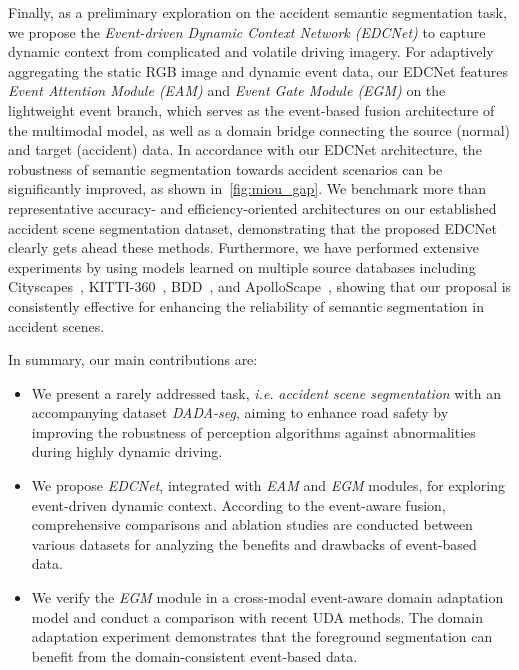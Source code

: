 \documentclass[journal]{IEEEtran}
\begin{document}
Finally, as a preliminary exploration on the accident semantic segmentation task, we propose the \emph{Event-driven Dynamic Context Network (EDCNet)} to capture dynamic context from complicated and volatile driving imagery. For adaptively aggregating the static RGB image and dynamic event data, our EDCNet features \emph{Event Attention Module (EAM)} and \emph{Event Gate Module (EGM)} on the lightweight event branch, which serves as the event-based fusion architecture of the multimodal model, as well as a domain bridge connecting the source (normal) and target (accident) data. In accordance with our EDCNet architecture, the robustness of semantic segmentation towards accident scenarios can be significantly improved, as shown in~\cref{fig:miou_gap}. We benchmark more than  representative accuracy- and efficiency-oriented architectures on our established accident scene segmentation dataset, demonstrating that the proposed EDCNet clearly gets ahead these methods. Furthermore, we have performed extensive experiments by using models learned on multiple source databases including Cityscapes~\cite{cordts2016cityscapes}, KITTI-360~\cite{xie2016semantic}, BDD~\cite{yu2020bdd100k}, and ApolloScape~\cite{wang2019apolloscape}, showing that our proposal is consistently effective for enhancing the reliability of semantic segmentation in accident scenes.

In summary, our main contributions are:
\begin{itemize}
    \item We present a rarely addressed task, \textit{i.e.} \emph{accident scene segmentation} with an accompanying dataset \emph{DADA-seg}, aiming to enhance road safety by improving the robustness of perception algorithms against abnormalities during highly dynamic driving.
    \item We propose \emph{EDCNet}, integrated with \emph{EAM} and \emph{EGM} modules, for exploring event-driven dynamic context. According to the event-aware fusion, comprehensive comparisons and ablation studies are conducted between various datasets for analyzing the benefits and drawbacks of event-based data.
    \item We verify the \emph{EGM} module in a cross-modal event-aware domain adaptation model and conduct a comparison with recent UDA methods. The domain adaptation experiment demonstrates that the foreground segmentation can benefit from the domain-consistent event-based data.
\end{itemize}
\end{document}
